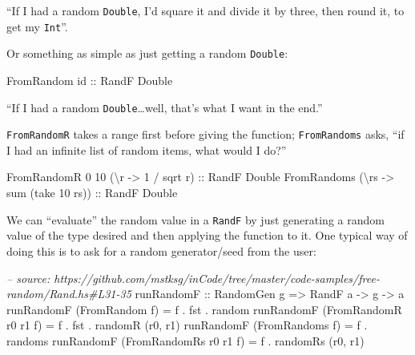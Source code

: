 \documentclass[]{article}
\newenvironment{Shaded}{}{}
\newcommand{\DataTypeTok}[1]{\textcolor[rgb]{0.56,0.13,0.00}{{#1}}}
\newcommand{\DecValTok}[1]{\textcolor[rgb]{0.25,0.63,0.44}{{#1}}}
\newcommand{\CommentTok}[1]{\textcolor[rgb]{0.38,0.63,0.69}{\textit{{#1}}}}
\newcommand{\OtherTok}[1]{\textcolor[rgb]{0.00,0.44,0.13}{{#1}}}
\newcommand{\FunctionTok}[1]{\textcolor[rgb]{0.02,0.16,0.49}{{#1}}}
\newcommand{\NormalTok}[1]{{#1}}
\begin{document}
``If I had a random \texttt{Double}, I'd square it and divide it by
three, then round it, to get my \texttt{Int}''.

Or something as simple as just getting a random \texttt{Double}:

\begin{Shaded}
\begin{Highlighting}[]
\DataTypeTok{FromRandom}\OtherTok{ id ::} \DataTypeTok{RandF} \DataTypeTok{Double}
\end{Highlighting}
\end{Shaded}

``If I had a random \texttt{Double}\ldots{}well, that's what I want in
the end.''

\texttt{FromRandomR} takes a range first before giving the function;
\texttt{FromRandoms} asks, ``if I had an infinite list of random items,
what would I do?''

\begin{Shaded}
\begin{Highlighting}[]
\DataTypeTok{FromRandomR} \DecValTok{0} \DecValTok{10} \NormalTok{(\textbackslash{}r }\OtherTok{->} \DecValTok{1} \FunctionTok{/} \NormalTok{sqrt r)}\OtherTok{ ::} \DataTypeTok{RandF} \DataTypeTok{Double}
\DataTypeTok{FromRandoms} \NormalTok{(\textbackslash{}rs }\OtherTok{->} \NormalTok{sum (take }\DecValTok{10} \NormalTok{rs))}\OtherTok{ ::} \DataTypeTok{RandF} \DataTypeTok{Double}
\end{Highlighting}
\end{Shaded}

We can ``evaluate'' the random value in a \texttt{RandF} by just
generating a random value of the type desired and then applying the
function to it. One typical way of doing this is to ask for a random
generator/seed from the user:

\begin{Shaded}
\begin{Highlighting}[]
\CommentTok{-- source: https://github.com/mstksg/inCode/tree/master/code-samples/free-random/Rand.hs#L31-35}
\OtherTok{runRandomF ::} \DataTypeTok{RandomGen} \NormalTok{g }\OtherTok{=>} \DataTypeTok{RandF} \NormalTok{a }\OtherTok{->} \NormalTok{g }\OtherTok{->} \NormalTok{a}
\NormalTok{runRandomF (}\DataTypeTok{FromRandom} \NormalTok{f)         }\FunctionTok{=} \NormalTok{f }\FunctionTok{.} \NormalTok{fst }\FunctionTok{.} \NormalTok{random}
\NormalTok{runRandomF (}\DataTypeTok{FromRandomR} \NormalTok{r0 r1 f)  }\FunctionTok{=} \NormalTok{f }\FunctionTok{.} \NormalTok{fst }\FunctionTok{.} \NormalTok{randomR (r0, r1)}
\NormalTok{runRandomF (}\DataTypeTok{FromRandoms} \NormalTok{f)        }\FunctionTok{=} \NormalTok{f }\FunctionTok{.} \NormalTok{randoms}
\NormalTok{runRandomF (}\DataTypeTok{FromRandomRs} \NormalTok{r0 r1 f) }\FunctionTok{=} \NormalTok{f }\FunctionTok{.} \NormalTok{randomRs (r0, r1)}
\end{Highlighting}
\end{Shaded}
\end{document}
